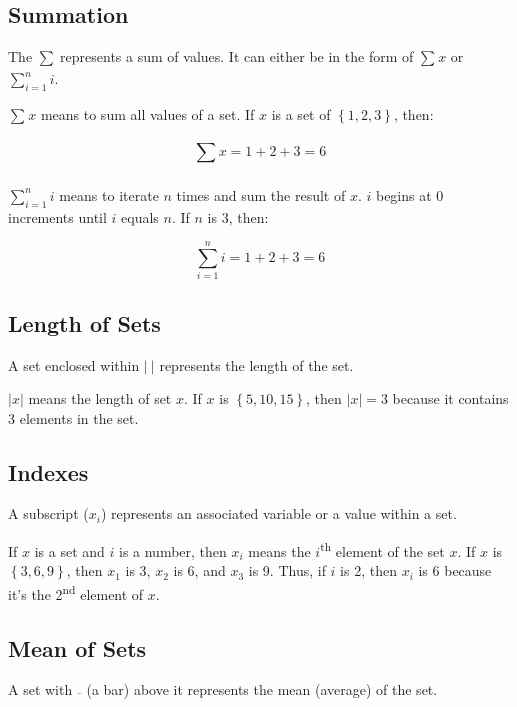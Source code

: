 \documentclass{article}
\begin{document}
\begin{sloppypar}
\hypertarget{summation}{%
\subsection{Summation}\label{summation}}

The \(\sum_{}^{}\ \)represents a sum of values. It can either be in the
form of \(\sum_{}^{}x\) or \(\sum_{i = 1}^{n}i\).

\(\sum_{}^{}x\) means to sum all values of a set. If \(x\) is a set of
\(\left\{ 1,2,3 \right\}\), then:

\[\sum_{}^{}x = 1 + 2 + 3 = 6\]

\(\sum_{i = 1}^{n}i\) means to iterate \(n\) times and sum the result of
\(x\). \(i\) begins at \(0\) increments until \(i\) equals \(n\). If
\(n\) is 3, then:

\[\sum_{i = 1}^{n}i = 1 + 2 + 3 = 6\]

\hypertarget{length-of-sets}{%
\subsection{Length of Sets}\label{length-of-sets}}

A set enclosed within \(\left| \  \right|\) represents the length of the
set.

\(\left| x \right|\) means the length of set \(x\). If \(x\) is
\(\left\{ 5,10,15 \right\}\), then \(\left| x \right| = 3\) because it
contains 3 elements in the set.

\hypertarget{indexes}{%
\subsection{Indexes}\label{indexes}}

A subscript (\(x_{i}\)) represents an associated variable or a value
within a set.

If \(x\) is a set and \(i\) is a number, then \(x_{i}\) means the
\(i\)\textsuperscript{th} element of the set \(x\). If \(x\) is
\(\left\{ 3,6,9 \right\}\), then \(x_{1}\) is 3, \(x_{2}\) is 6, and
\(x_{3}\) is 9. Thus, if \(i\) is 2, then \(x_{i}\) is 6 because it's
the 2\textsuperscript{nd} element of \(x\).

\hypertarget{mean-of-sets}{%
\subsection{Mean of Sets}\label{mean-of-sets}}

A set with \(\overline{}\) (a bar) above it represents the mean
(average) of the set.


\end{sloppypar}
\end{document}
